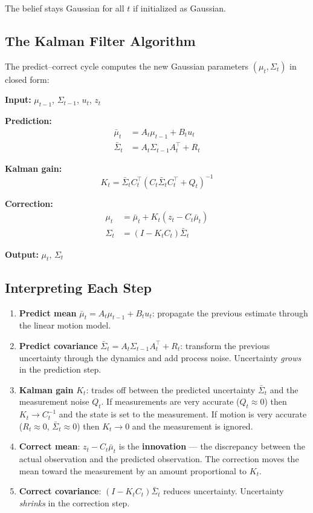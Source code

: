\documentclass[11pt,a4paper]{article}
\theoremstyle{definition}
\theoremstyle{plain}
\theoremstyle{remark}
\begin{document}
The belief stays Gaussian for all $t$ if initialized as Gaussian.

\subsection{The Kalman Filter Algorithm}

The predict--correct cycle computes the new Gaussian parameters $(\mu_t, \Sigma_t)$ in closed form:

\begin{tcolorbox}[colback=blue!5!white,colframe=blue!75!black,title=\textbf{Kalman Filter Algorithm}]
\textbf{Input:} $\mu_{t-1}$, $\Sigma_{t-1}$, $u_t$, $z_t$

\textbf{Prediction:}
\begin{align*}
\bar{\mu}_t &= A_t \mu_{t-1} + B_t u_t \\
\bar{\Sigma}_t &= A_t \Sigma_{t-1} A_t^\top + R_t
\end{align*}

\textbf{Kalman gain:}
\[
K_t = \bar{\Sigma}_t C_t^\top \left(C_t \bar{\Sigma}_t C_t^\top + Q_t\right)^{-1}
\]

\textbf{Correction:}
\begin{align*}
\mu_t &= \bar{\mu}_t + K_t(z_t - C_t \bar{\mu}_t) \\
\Sigma_t &= (I - K_t C_t)\bar{\Sigma}_t
\end{align*}

\textbf{Output:} $\mu_t$, $\Sigma_t$
\end{tcolorbox}

\subsection{Interpreting Each Step}

\begin{enumerate}
    \item \textbf{Predict mean} $\bar{\mu}_t = A_t \mu_{t-1} + B_t u_t$: propagate the previous estimate through the linear motion model.
    \item \textbf{Predict covariance} $\bar{\Sigma}_t = A_t \Sigma_{t-1} A_t^\top + R_t$: transform the previous uncertainty through the dynamics and add process noise. Uncertainty \textit{grows} in the prediction step.
    \item \textbf{Kalman gain} $K_t$: trades off between the predicted uncertainty $\bar{\Sigma}_t$ and the measurement noise $Q_t$. If measurements are very accurate ($Q_t \approx 0$) then $K_t \to C_t^{-1}$ and the state is set to the measurement. If motion is very accurate ($R_t \approx 0$, $\bar{\Sigma}_t \approx 0$) then $K_t \to 0$ and the measurement is ignored.
    \item \textbf{Correct mean}: $z_t - C_t \bar{\mu}_t$ is the \textbf{innovation} — the discrepancy between the actual observation and the predicted observation. The correction moves the mean toward the measurement by an amount proportional to $K_t$.
    \item \textbf{Correct covariance}: $(I - K_t C_t)\bar{\Sigma}_t$ reduces uncertainty. Uncertainty \textit{shrinks} in the correction step.
\end{enumerate}
\end{document}
